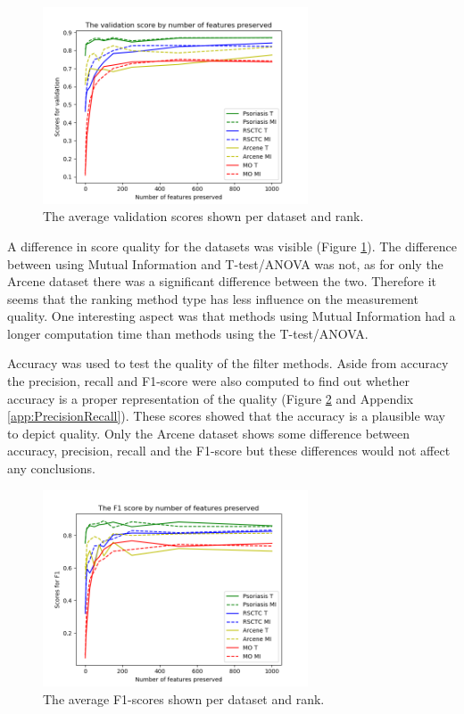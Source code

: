 \documentclass[10pt,a4paper]{article}
\begin{document}
	\begin{figure}[H]
		\includegraphics[width=0.7\textwidth]{Data_Rank_Val_Scores.png}
		\caption{The average validation scores shown per dataset and rank.}
		\label{fig:DatasetRankScores}
	\end{figure}
	
	A difference in score quality for the datasets was visible (Figure \ref{fig:DatasetRankScores}). The difference between using Mutual Information and T-test/ANOVA was not, as for only the Arcene dataset there was a significant difference between the two. Therefore it seems that the ranking method type has less influence on the measurement quality. One interesting aspect was that methods using Mutual Information had a longer computation time than methods using the T-test/ANOVA.
	
	Accuracy was used to test the quality of the filter methods. Aside from accuracy the precision, recall and F1-score were also computed to find out whether accuracy is a proper representation of the quality (Figure \ref{fig:DatasetRankF1Scores} and Appendix \ref{app:PrecisionRecall}). These scores showed that the accuracy is a plausible way to depict quality. Only the Arcene dataset shows some difference between accuracy, precision, recall and the F1-score but these differences would not affect any conclusions.
	
	\begin{figure}[H]
		\includegraphics[width=0.7\textwidth]{Data_Rank_F1_Scores.png}
		\caption{The average F1-scores shown per dataset and rank.}
		\label{fig:DatasetRankF1Scores}
	\end{figure}
	
\end{document}
